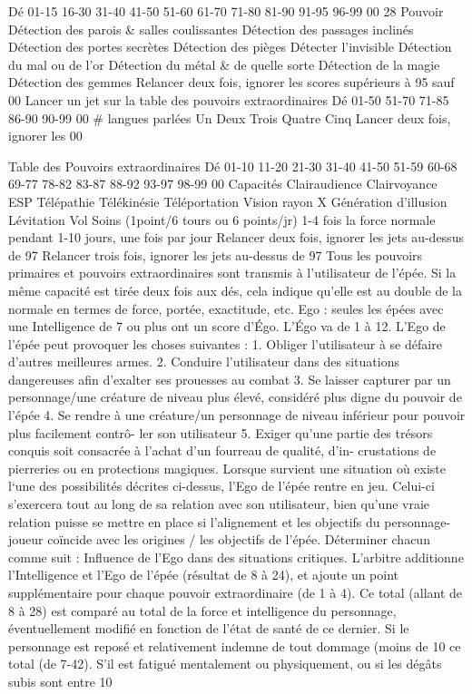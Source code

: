 \documentclass[12pt]{article}
\begin{document}
{Dé
01-15
16-30
31-40
41-50
51-60
61-70
71-80
81-90
91-95
96-99
00
28
Pouvoir
Détection des parois \& salles coulissantes
Détection des passages inclinés
Détection des portes secrètes
Détection des pièges
Détecter l'invisible
Détection du mal ou de l'or
Détection du métal \& de quelle sorte
Détection de la magie
Détection des gemmes
Relancer deux fois, ignorer les scores supérieurs à 95
sauf 00
Lancer un jet sur la table des pouvoirs extraordinaires
Dé
01-50
51-70
71-85
86-90
90-99
00
\# langues parlées
Un
Deux
Trois
Quatre
Cinq
Lancer deux fois,
ignorer les 00


Table des Pouvoirs extraordinaires
Dé
01-10
11-20
21-30
31-40
41-50
51-59
60-68
69-77
78-82
83-87
88-92
93-97
98-99
00
Capacités
Clairaudience
Clairvoyance
ESP
Télépathie
Télékinésie
Téléportation
Vision rayon X
Génération d'illusion
Lévitation
Vol
Soins (1point/6 tours ou 6 points/jr)
1-4 fois la force normale pendant 1-10 jours, une fois par jour
Relancer deux fois, ignorer les jets au-dessus de 97
Relancer trois fois, ignorer les jets au-dessus de 97
Tous les pouvoirs primaires et pouvoirs extraordinaires sont transmis à l’utilisateur de l’épée. Si la même
capacité est tirée deux fois aux dés, cela indique qu’elle est au double de la normale en termes de force,
portée, exactitude, etc.
Ego : seules les épées avec une Intelligence de 7 ou plus ont un score d’Égo. L’Égo va de 1 à 12. L’Ego de
l’épée peut provoquer les choses suivantes :
1. Obliger l’utilisateur à se défaire d’autres meilleures armes.
2. Conduire l’utilisateur dans des situations dangereuses afin d’exalter ses prouesses au combat
3. Se laisser capturer par un personnage/une créature de niveau plus élevé, considéré plus digne du
pouvoir de l’épée
4. Se rendre à une créature/un personnage de niveau inférieur pour pouvoir plus facilement contrô-
ler son utilisateur
5. Exiger qu’une partie des trésors conquis soit consacrée à l’achat d’un fourreau de qualité, d’in-
crustations de pierreries ou en protections magiques.
Lorsque survient une situation où existe l‘une des possibilités décrites ci-dessus, l’Ego de l’épée rentre en
jeu. Celui-ci s’exercera tout au long de sa relation avec son utilisateur, bien qu’une vraie relation puisse
se mettre en place si l’alignement et les objectifs du personnage-joueur coïncide avec les origines / les
objectifs de l’épée.
Déterminer chacun comme suit :
Influence de l’Ego dans des situations critiques. L’arbitre additionne l’Intelligence et l’Ego de l’épée
(résultat de 8 à 24), et ajoute un point supplémentaire pour chaque pouvoir extraordinaire (de 1
à 4). Ce total (allant de 8 à 28) est comparé au total de la force et intelligence du personnage,
éventuellement modifié en fonction de l’état de santé de ce dernier. Si le personnage est reposé et
relativement indemne de tout dommage (moins de 10 %
ce total (de 7-42).
S’il est fatigué mentalement ou physiquement, ou si les dégâts subis sont entre 10 %

}
\end{document}
